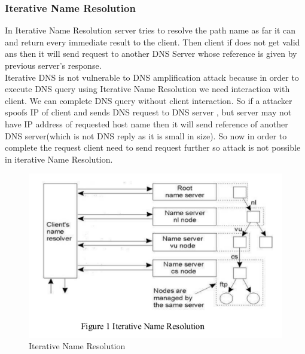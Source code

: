 \documentclass[11pt]{article}
\begin{document}
\subsubsection{Iterative Name Resolution}
In Iterative Name Resolution server tries to resolve the path name as far it can and return every immediate result to the client. Then client if does not get valid ans then it will send request to another DNS Server whose reference is given by previous server's response. \\
Iterative DNS is not vulnerable to DNS amplification attack because in order to execute DNS query using Iterative Name Resolution we need interaction with client. We can complete DNS query without client interaction. So if a attacker spoofs IP of client and sends DNS request to DNS server , but server may not have IP address of requested host name then it will send reference of another DNS server(which is not DNS reply as it is small in size). So now in order to complete the request client need to send request further so attack is not possible in iterative Name Resolution.
\begin{figure}[h]
\includegraphics[scale=0.6]{iter.png}
\caption{Iterative Name Resolution}
\end{figure}
\end{document}
